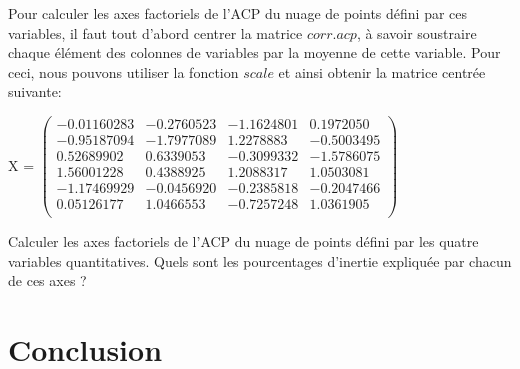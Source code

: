 \documentclass[titlepage]{article}
\begin{document}
\subsubsection{}
Pour calculer les axes factoriels de l\textquoteright ACP du nuage de points défini par ces variables, il faut tout d'abord centrer la matrice $corr.acp$, à savoir soustraire chaque élément des colonnes de variables par la moyenne de cette variable. Pour ceci, nous pouvons utiliser la fonction $scale$ et ainsi obtenir la matrice centrée suivante:
\begin{center}
X =
$
\begin{pmatrix}
-0.01160283 & -0.2760523 & -1.1624801 & 0.1972050 \\ 
-0.95187094 & -1.7977089 & 1.2278883 & -0.5003495 \\
0.52689902 & 0.6339053 & -0.3099332 & -1.5786075 \\
1.56001228 & 0.4388925 & 1.2088317 & 1.0503081 \\
-1.17469929 & -0.0456920 & -0.2385818 & -0.2047466 \\
0.05126177 & 1.0466553 & -0.7257248 & 1.0361905 \\
\end{pmatrix} 
$
\end{center}
Calculer les axes factoriels de l’ACP du nuage de points défini par les quatre variables quantitatives.
Quels sont les pourcentages d’inertie expliquée par chacun de ces axes ?


\section{Conclusion}
\end{document}
